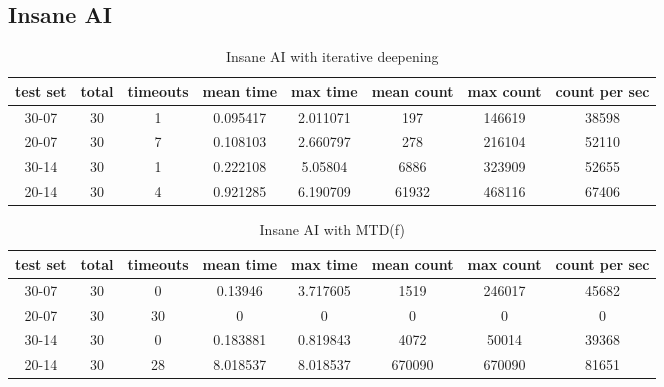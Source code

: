\documentclass[a4paper]{article}
\begin{document}
\subsection{Insane AI}


\begin{table}[h]
	\centering
	\begin{adjustbox}{center}
	\begin{tabular}{|c|c|c|c|c|c|c|c|}\hline
	\textbf{test set} & \textbf{total} & \textbf{timeouts} & \textbf{mean time} & \textbf{max time} & \textbf{mean count} & \textbf{max count} & \textbf{count per sec} \\\hline
	30-07 & 30 & 1 & 0.095417 & 2.011071 & 197 & 146619 & 38598 \\\hline
	20-07 & 30 & 7 & 0.108103 & 2.660797 & 278 & 216104 & 52110 \\\hline
	30-14 & 30 & 1 & 0.222108 & 5.05804 & 6886 & 323909 & 52655 \\\hline
	20-14 & 30 & 4 & 0.921285 & 6.190709 & 61932 & 468116 & 67406 \\\hline
	\end{tabular}
	\end{adjustbox}
	\caption{Insane AI with iterative deepening}
	\label{tab: }
\end{table}

\begin{table}[h]
	\centering
	\begin{adjustbox}{center}
	\begin{tabular}{|c|c|c|c|c|c|c|c|}\hline
	\textbf{test set} & \textbf{total} & \textbf{timeouts} & \textbf{mean time} & \textbf{max time} & \textbf{mean count} & \textbf{max count} & \textbf{count per sec} \\\hline
	30-07 & 30 & 0 & 0.13946 & 3.717605 & 1519 & 246017 & 45682 \\\hline
	20-07 & 30 & 30 & 0 & 0 & 0 & 0 & 0 \\\hline
	30-14 & 30 & 0 & 0.183881 & 0.819843 & 4072 & 50014 & 39368 \\\hline
	20-14 & 30 & 28 & 8.018537 & 8.018537 & 670090 & 670090 & 81651 \\\hline
	\end{tabular}
	\end{adjustbox}
	\caption{Insane AI with MTD(f)}
	\label{tab: }
\end{table}
\end{document}
